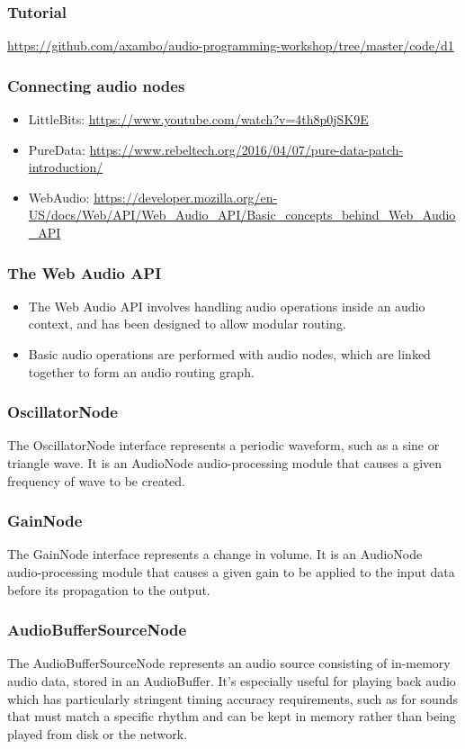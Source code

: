 \documentclass[screen, aspectratio=43]{beamer}
\begin{document}
%
\begin{frame}
\frametitle{Tutorial}
\url{https://github.com/axambo/audio-programming-workshop/tree/master/code/d1}
\end{frame}
%
\begin{frame}
\frametitle{Connecting audio nodes}
\begin{itemize}
\item LittleBits: \url{https://www.youtube.com/watch?v=4th8p0jSK9E}
\item PureData: \url{https://www.rebeltech.org/2016/04/07/pure-data-patch-introduction/}
\item WebAudio: \url{https://developer.mozilla.org/en-US/docs/Web/API/Web_Audio_API/Basic_concepts_behind_Web_Audio_API}
\end{itemize}
\end{frame}
%
\begin{frame}
\frametitle{The Web Audio API}
\begin{itemize}
\item The Web Audio API involves handling audio operations inside an audio context, and has been designed to allow modular routing.
\item Basic audio operations are performed with audio nodes, which are linked together to form an audio routing graph.
\end{itemize}
\end{frame}
%
\begin{frame}
\frametitle{OscillatorNode}
The OscillatorNode interface represents a periodic waveform, such as a sine or triangle wave. It is an AudioNode audio-processing module that causes a given frequency of wave to be created.
\end{frame}
%
\begin{frame}
\frametitle{GainNode}
The GainNode interface represents a change in volume. It is an AudioNode audio-processing module that causes a given gain to be applied to the input data before its propagation to the output.
\end{frame}
%
\begin{frame}
\frametitle{AudioBufferSourceNode}
The AudioBufferSourceNode represents an audio source consisting of in-memory audio data, stored in an AudioBuffer. It's especially useful for playing back audio which has particularly stringent timing accuracy requirements, such as for sounds that must match a specific rhythm and can be kept in memory rather than being played from disk or the network. 
\end{frame}
\end{document}
